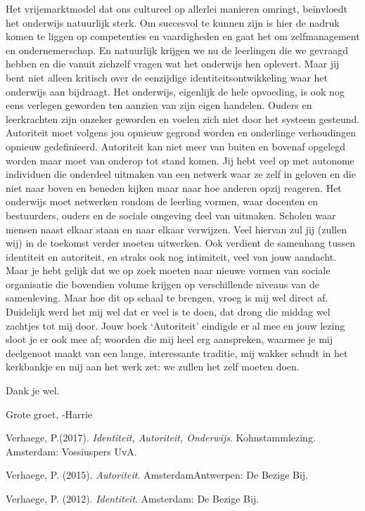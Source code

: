 \documentclass[]{book}
\begin{document}
Het vrijemarktmodel dat ons cultureel op allerlei manieren omringt,
beïnvloedt het onderwijs natuurlijk sterk. Om succesvol te kunnen zijn
is hier de nadruk komen te liggen op competenties en vaardigheden en
gaat het om zelfmanagement en ondernemerschap. En natuurlijk krijgen we
nu de leerlingen die we gevraagd hebben en die vanuit zichzelf vragen
wat het onderwijs hen oplevert. Maar jij bent niet alleen kritisch over
de eenzijdige identiteitsontwikkeling waar het onderwijs aan bijdraagt.
Het onderwijs, eigenlijk de hele opvoeding, is ook nog eens verlegen
geworden ten aanzien van zijn eigen handelen. Ouders en leerkrachten
zijn onzeker geworden en voelen zich niet door het systeem gesteund.
Autoriteit moet volgens jou opnieuw gegrond worden en onderlinge
verhoudingen opnieuw gedefinieerd. Autoriteit kan niet meer van buiten
en bovenaf opgelegd worden maar moet van onderop tot stand komen. Jij
hebt veel op met autonome individuen die onderdeel uitmaken van een
netwerk waar ze zelf in geloven en die niet naar boven en beneden kijken
maar naar hoe anderen opzij reageren. Het onderwijs moet netwerken
rondom de leerling vormen, waar docenten en bestuurders, ouders en de
sociale omgeving deel van uitmaken. Scholen waar mensen naast elkaar
staan en naar elkaar verwijzen. Veel hiervan zul jij (zullen wij) in de
toekomst verder moeten uitwerken. Ook verdient de samenhang tussen
identiteit en autoriteit, en straks ook nog intimiteit, veel van jouw
aandacht. Maar je hebt gelijk dat we op zoek moeten naar nieuwe vormen
van sociale organisatie die bovendien volume krijgen op verschillende
niveaus van de samenleving. Maar hoe dit op schaal te brengen, vroeg is
mij wel direct af. Duidelijk werd het mij wel dat er veel is te doen,
dat drong die middag wel zachtjes tot mij door. Jouw boek `Autoriteit'
eindigde er al mee en jouw lezing sloot je er ook mee af; woorden die
mij heel erg aanspreken, waarmee je mij deelgenoot maakt van een lange,
interessante traditie, mij wakker schudt in het kerkbankje en mij aan
het werk zet: we zullen het zelf moeten doen.

Dank je wel.

Grote groet, -Harrie

Verhaege, P.(2017). \emph{Identiteit, Autoriteit, Onderwijs}.
Kohnstammlezing. Amsterdam: Vossiuspers UvA.

Verhaege, P. (2015). \emph{Autoriteit}. Amsterdam\textbar{}Antwerpen: De
Bezige Bij.

Verhaege, P. (2012). \emph{Identiteit}. Amsterdam: De Bezige Bij.
\end{document}
